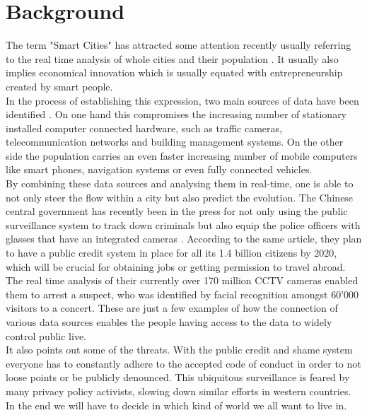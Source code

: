 \documentclass[letterpaper]{article}
\begin{document}
\section{Background}\label{sec:background}
The term "Smart Cities" has attracted some attention recently \cite{Ferdowsi2018,Abu-Matar2018,Usman2018} usually referring to the real time analysis of whole cities and their population \cite{smartCities3}. It usually also implies economical innovation which is usually equated with entrepreneurship created by smart people.\\
\indent In the process of establishing this expression, two main  sources of data have been identified \cite{smartCities3}. On one hand this compromises the increasing number of stationary installed computer connected hardware, such as traffic cameras, telecommunication networks and building management systems. On the other side the population carries an even faster increasing number of mobile computers like smart phones, navigation systems or even fully connected vehicles.\\
\indent By combining these data sources and analysing them in real-time, one is able to not only steer the flow within a city but also predict the evolution. The Chinese central government has recently been in the press \cite{thediplomat1} for not only using the public surveillance system to track down criminals but also equip the police officers with glasses that have an integrated cameras \cite{cnet1}. According to the same article, they plan to have a public credit system in place for all its 1.4 billion citizens by 2020, which will be crucial for obtaining jobs or getting permission to travel abroad.\\
\indent The real time analysis of their currently over 170 million CCTV cameras \cite{bbc1} enabled them to arrest a suspect, who was identified by facial recognition amongst 60'000 visitors to a concert. These are just a few examples of how the connection of various data sources enables the people having access to the data to widely control public live.\\
\indent It also points out some of the threats. With the public credit and shame system \cite{cnet1} everyone has to constantly adhere to the accepted code of conduct in order to not loose points or be publicly denounced. This ubiquitous surveillance is feared by many privacy policy activists, slowing down similar efforts in western countries. In the end we will have to decide in which kind of world we all want to live in.\\
\end{document}
